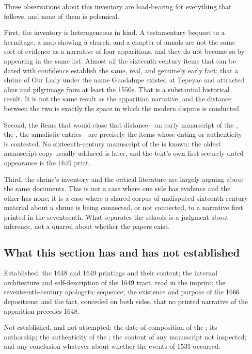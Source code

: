 Three observations about this inventory are load-bearing for
everything that follows, and none of them is polemical.

First, the inventory is heterogeneous in kind. A testamentary bequest
to a hermitage, a map showing a church, and a chapter of annals are
not the same sort of evidence as a narrative of four apparitions, and
they do not become so by appearing in the same list. Almost all the
sixteenth-century items that can be dated with confidence establish
the same, real, and genuinely early fact: that a shrine of Our Lady
under the name Guadalupe existed at Tepeyac and attracted alms and
pilgrimage from at least the 1550s. That is a substantial historical
result. It is not the same result as the apparition narrative, and
the distance between the two is exactly the space in which the modern
dispute is conducted.

Second, the items that would close that distance---an early
manuscript of the , the , the annalistic entries---are precisely the items whose
dating or authenticity is contested. No sixteenth-century manuscript
of the  is known: the oldest manuscript copy
usually adduced is later, and the text's own first securely dated
appearance is the 1649 print.

Third, the shrine's inventory and the critical literature are largely
arguing about the same documents. This is not a case where one side
has evidence and the other has none; it is a case where a shared
corpus of undisputed sixteenth-century material about a shrine is
being connected, or not connected, to a narrative first printed in
the seventeenth. What separates the schools is a judgment about
inference, not a quarrel about whether the papers exist.

\subsection{What this section has and has not established}

Established: the 1648 and 1649 printings and their content; the
internal architecture and self-description of the 1649 tract, read in
the imprint; the seventeenth-century apologetic sequence; the
existence and purpose of the 1666 depositions; and the fact,
conceded on both sides, that no printed narrative of the apparition
precedes 1648.

Not established, and not attempted: the date of composition of the
; its authorship; the authenticity of the
; the content of any manuscript not
inspected; and any conclusion whatever about whether the events of
1531 occurred.
